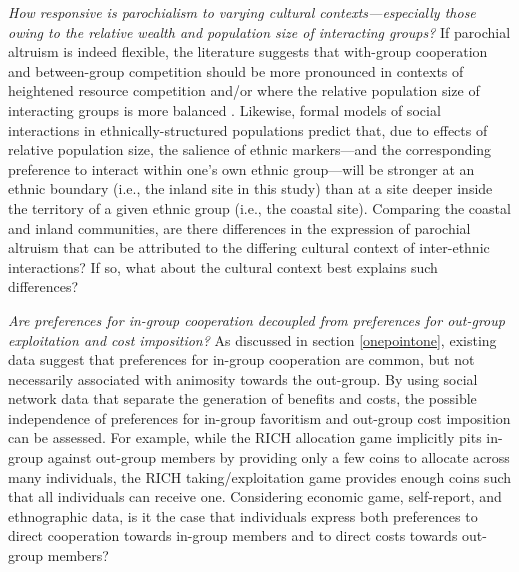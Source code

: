 \documentclass[bibauthoryear]{aa}
\begin{document}
\begin{enumerate*}[label={Q(\arabic*)},font={\color{blue!50!black}\bfseries}]
\item \label{q2} \emph{How responsive is  parochialism to varying cultural contexts---especially those owing to the relative wealth and population size of interacting groups?} If parochial altruism is indeed flexible, the literature suggests that with-group cooperation and between-group competition should be more pronounced in contexts of heightened resource competition \citep{bellmoya} and/or where the  relative population size of interacting groups is more balanced \citep{advani2015melting}. Likewise, formal models of social interactions in ethnically-structured populations \citep{mcelreath2003shared, bunce2018sustainability} predict that, due to effects of relative population size, the salience of ethnic markers---and the corresponding preference to interact within one's own ethnic group---will be stronger at an ethnic boundary (i.e., the inland site in this study) than at a site deeper inside the territory of a given ethnic group (i.e., the coastal site).
 Comparing the coastal and inland communities, are there differences in the expression of parochial altruism that can be attributed to the differing cultural context of inter-ethnic interactions? If so, what about the cultural context best explains such differences?\\
 \indent
 
\item \label{q4} \emph{Are preferences for in-group cooperation decoupled from preferences for out-group exploitation and cost imposition?} As discussed in section \ref{onepointone}, existing data suggest that preferences for in-group cooperation are common, but  not necessarily associated with animosity towards the out-group. By using social network data that separate the generation of benefits and costs, the possible independence of preferences for in-group favoritism and out-group cost imposition can be assessed. For example, while the RICH allocation game implicitly pits in-group against out-group members by providing only a few coins to allocate across many individuals, the RICH taking/exploitation game provides enough coins such that all individuals can receive one. 
Considering economic game, self-report, and ethnographic data, is it the case that individuals express both preferences to direct cooperation towards in-group members and to direct costs towards out-group members?
\\
\indent


\end{enumerate*}
\end{document}
